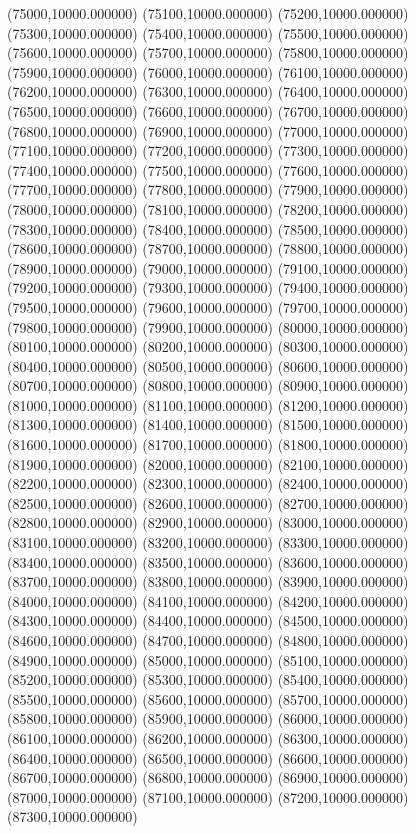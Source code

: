 (75000,10000.000000)
(75100,10000.000000)
(75200,10000.000000)
(75300,10000.000000)
(75400,10000.000000)
(75500,10000.000000)
(75600,10000.000000)
(75700,10000.000000)
(75800,10000.000000)
(75900,10000.000000)
(76000,10000.000000)
(76100,10000.000000)
(76200,10000.000000)
(76300,10000.000000)
(76400,10000.000000)
(76500,10000.000000)
(76600,10000.000000)
(76700,10000.000000)
(76800,10000.000000)
(76900,10000.000000)
(77000,10000.000000)
(77100,10000.000000)
(77200,10000.000000)
(77300,10000.000000)
(77400,10000.000000)
(77500,10000.000000)
(77600,10000.000000)
(77700,10000.000000)
(77800,10000.000000)
(77900,10000.000000)
(78000,10000.000000)
(78100,10000.000000)
(78200,10000.000000)
(78300,10000.000000)
(78400,10000.000000)
(78500,10000.000000)
(78600,10000.000000)
(78700,10000.000000)
(78800,10000.000000)
(78900,10000.000000)
(79000,10000.000000)
(79100,10000.000000)
(79200,10000.000000)
(79300,10000.000000)
(79400,10000.000000)
(79500,10000.000000)
(79600,10000.000000)
(79700,10000.000000)
(79800,10000.000000)
(79900,10000.000000)
(80000,10000.000000)
(80100,10000.000000)
(80200,10000.000000)
(80300,10000.000000)
(80400,10000.000000)
(80500,10000.000000)
(80600,10000.000000)
(80700,10000.000000)
(80800,10000.000000)
(80900,10000.000000)
(81000,10000.000000)
(81100,10000.000000)
(81200,10000.000000)
(81300,10000.000000)
(81400,10000.000000)
(81500,10000.000000)
(81600,10000.000000)
(81700,10000.000000)
(81800,10000.000000)
(81900,10000.000000)
(82000,10000.000000)
(82100,10000.000000)
(82200,10000.000000)
(82300,10000.000000)
(82400,10000.000000)
(82500,10000.000000)
(82600,10000.000000)
(82700,10000.000000)
(82800,10000.000000)
(82900,10000.000000)
(83000,10000.000000)
(83100,10000.000000)
(83200,10000.000000)
(83300,10000.000000)
(83400,10000.000000)
(83500,10000.000000)
(83600,10000.000000)
(83700,10000.000000)
(83800,10000.000000)
(83900,10000.000000)
(84000,10000.000000)
(84100,10000.000000)
(84200,10000.000000)
(84300,10000.000000)
(84400,10000.000000)
(84500,10000.000000)
(84600,10000.000000)
(84700,10000.000000)
(84800,10000.000000)
(84900,10000.000000)
(85000,10000.000000)
(85100,10000.000000)
(85200,10000.000000)
(85300,10000.000000)
(85400,10000.000000)
(85500,10000.000000)
(85600,10000.000000)
(85700,10000.000000)
(85800,10000.000000)
(85900,10000.000000)
(86000,10000.000000)
(86100,10000.000000)
(86200,10000.000000)
(86300,10000.000000)
(86400,10000.000000)
(86500,10000.000000)
(86600,10000.000000)
(86700,10000.000000)
(86800,10000.000000)
(86900,10000.000000)
(87000,10000.000000)
(87100,10000.000000)
(87200,10000.000000)
(87300,10000.000000)
